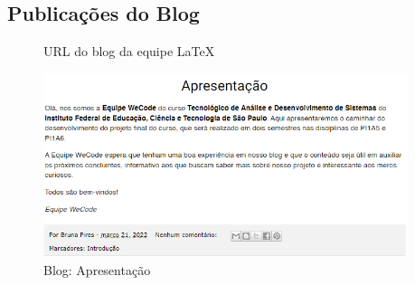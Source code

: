 
\begin{apendicesenv}

\partapendices

\chapter{Publicações do Blog}

\begin{figure}[htb]
	\caption{\label{qr-url-blog}URL do blog da equipe \LaTeX}
	\begin{center}
	\end{center}
\end{figure}

\begin{figure}[H]
	\centering
	\caption{Blog: Apresentação}
	\includegraphics[width=0.95\textwidth]{../imagens/blog-posts/semana00apresentacao.png}
\end{figure}


\end{apendicesenv}
